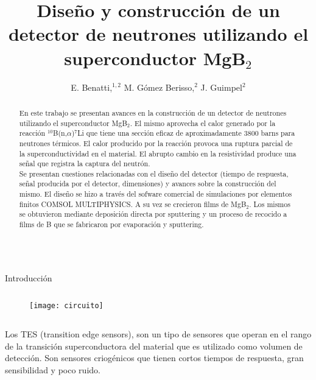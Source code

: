 \documentclass[final]{beamer}
\title{Diseño y construcción de un detector de neutrones utilizando el superconductor MgB$_2$}
\author{E. Benatti,$^{1,2}$ M. Gómez Berisso,$^{2}$ J. Guimpel$^{2}$}
\institute{$^{1}$Instituto Balseiro, Comisión Nacional de Energía Atómica, Universidad Nacional de Cuyo.\\ $^{2}$ Laboratorio de Bajas Temperaturas, Centro Atómico Bariloche, Comisión Nacional de Energía Atómica.}
\newlength{\sepwid}
\newlength{\onecolwid}
\begin{document}
\begin{frame}[t]
\vspace{-2.5cm}
\hspace{-3cm}
\begin{abstract}
\hspace*{1.3cm}En este trabajo se presentan avances en la construcción de un detector de neutrones utilizando el superconductor MgB$_2$. El mismo aprovecha el calor generado por la reacción $^{10}$B(n,$\alpha$)$^{7}$Li que tiene una sección eficaz de aproximadamente 3800 barns para neutrones térmicos. El calor producido por la reacción provoca una ruptura parcial de la superconductividad en el material. El abrupto cambio en la resistividad produce una señal que registra la captura del neutrón.\\
\hspace*{1.3cm}Se presentan cuestiones relacionadas con el diseño del detector (tiempo de respuesta, señal producida por el detector, dimensiones) y avances sobre la construcción del mismo. El diseño se hizo a través del sofware comercial de simulaciones por elementos finitos COMSOL MULTIPHYSICS. A su vez se crecieron films de MgB$_2$. Los mismos se obtuvieron mediante deposición directa por sputtering y un proceso de recocido a films de B que se fabricaron por evaporación y sputtering.
\end{abstract}
\vspace{-1.5cm}
\begin{columns}[t]					%
\hspace{-4cm}
\begin{column}{\onecolwid}
\begin{block}{\normalsize{Introducción}}
\begin{column}{18cm}
\vspace*{-2cm}
\begin{figure}
\texttt{[image: circuito]}
\end{figure}
\end{column}
\begin{column}{19cm}
Los TES (transition edge sensors), son un tipo de sensores que operan en el rango de la transición superconductora del material que es utilizado como volumen de detección. Son sensores criogénicos que tienen cortos tiempos de respuesta, gran sensibilidad y poco ruido.

\end{column}
\end{block}
\end{column}
\end{columns}
\end{frame}
\end{document}
